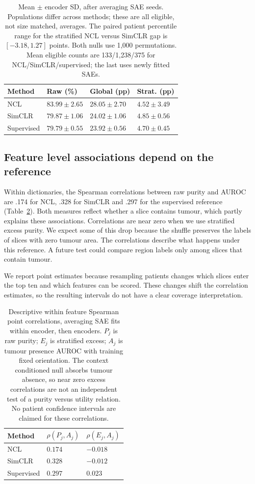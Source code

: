 \documentclass[letterpaper]{article}
\begin{document}
\begin{table}[!b]
\centering\small
\begin{tabular}{@{}llll@{}}
\toprule
Method & Raw (\%) & Global (pp) & Strat. (pp)\\\midrule
NCL & $83.99\pm2.65$ & $28.05\pm2.70$ & $4.52\pm3.49$ \\
SimCLR & $79.87\pm1.06$ & $24.02\pm1.06$ & $4.85\pm0.56$ \\
Supervised & $79.79\pm0.55$ & $23.92\pm0.56$ & $4.70\pm0.45$ \\
\bottomrule
\end{tabular}
\caption{Mean $\pm$ encoder SD, after averaging SAE seeds. Populations differ across methods; these are all eligible, not size matched, averages. The paired patient percentile range for the stratified NCL versus SimCLR gap is $[-3.18,1.27]$ points. Both nulls use 1,000 permutations. Mean eligible counts are 133/1,238/375 for NCL/SimCLR/supervised; the last uses newly fitted SAEs.}
\label{tab:context}
\end{table}

\subsection{Feature level associations depend on the reference}
Within dictionaries, the Spearman correlations between raw purity and AUROC are .174 for NCL, .328 for SimCLR and .297 for the supervised reference (Table~\ref{tab:featureutility}). Both measures reflect whether a slice contains tumour, which partly explains these associations. Correlations are near zero when we use stratified excess purity. We expect some of this drop because the shuffle preserves the labels of slices with zero tumour area. The correlations describe what happens under this reference. A future test could compare region labels only among slices that contain tumour.

We report point estimates because resampling patients changes which slices enter the top ten and which features can be scored. These changes shift the correlation estimates, so the resulting intervals do not have a clear coverage interpretation.

\begin{table}[!b]
\centering\small
\begin{tabular}{@{}lll@{}}
\toprule
Method & $\rho(P_j,A_j)$ & $\rho(E_j,A_j)$\\\midrule
NCL & $0.174$ & $-0.018$ \\
SimCLR & $0.328$ & $-0.012$ \\
Supervised & $0.297$ & $0.023$ \\
\bottomrule
\end{tabular}
\caption{Descriptive within feature Spearman point correlations, averaging SAE fits within encoder, then encoders. $P_j$ is raw purity; $E_j$ is stratified excess; $A_j$ is tumour presence AUROC with training fixed orientation. The context conditioned null absorbs tumour absence, so near zero excess correlations are not an independent test of a purity versus utility relation. No patient confidence intervals are claimed for these correlations.}
\label{tab:featureutility}
\end{table}
\end{document}
